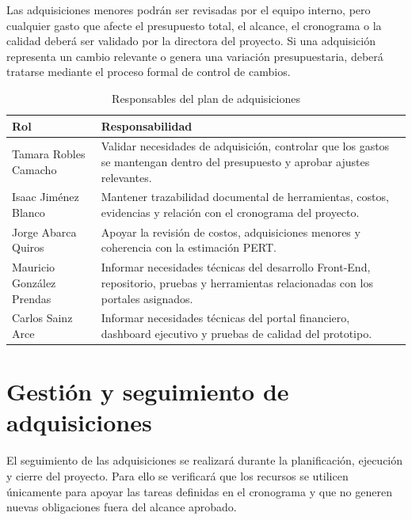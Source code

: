 \documentclass[11pt,spanish]{article}
\begin{document}
Las adquisiciones menores podrán ser revisadas por el equipo interno, pero cualquier gasto que afecte el presupuesto total, el alcance, el cronograma o la calidad deberá ser validado por la directora del proyecto. Si una adquisición representa un cambio relevante o genera una variación presupuestaria, deberá tratarse mediante el proceso formal de control de cambios.

\begin{table}[H]
\centering
\caption{Responsables del plan de adquisiciones}
\label{tab:responsables-adquisiciones}
{\small
\begin{tabularx}{\textwidth}{p{4cm} Y}
\toprule
\textbf{Rol} & \textbf{Responsabilidad} \\
\midrule
Tamara Robles Camacho & Validar necesidades de adquisición, controlar que los gastos se mantengan dentro del presupuesto y aprobar ajustes relevantes. \\
Isaac Jiménez Blanco & Mantener trazabilidad documental de herramientas, costos, evidencias y relación con el cronograma del proyecto. \\
Jorge Abarca Quiros & Apoyar la revisión de costos, adquisiciones menores y coherencia con la estimación PERT. \\
Mauricio González Prendas & Informar necesidades técnicas del desarrollo Front-End, repositorio, pruebas y herramientas relacionadas con los portales asignados. \\
Carlos Sainz Arce & Informar necesidades técnicas del portal financiero, dashboard ejecutivo y pruebas de calidad del prototipo. \\
\bottomrule
\end{tabularx}
}
\end{table}

\section{Gestión y seguimiento de adquisiciones}

El seguimiento de las adquisiciones se realizará durante la planificación, ejecución y cierre del proyecto. Para ello se verificará que los recursos se utilicen únicamente para apoyar las tareas definidas en el cronograma y que no generen nuevas obligaciones fuera del alcance aprobado.
\end{document}
